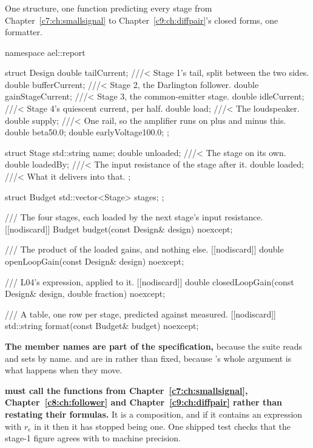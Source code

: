 \subsubsection{}
One structure, one function predicting every stage from Chapter~\ref{c7:ch:smallsignal} to Chapter~\ref{c9:ch:diffpair}'s closed forms, one formatter.

\begin{cppcode}
namespace ael::report
{
struct Design
{
    double tailCurrent{};       ///< Stage 1's tail, split between the two sides.
    double bufferCurrent{};     ///< Stage 2, the Darlington follower.
    double gainStageCurrent{};  ///< Stage 3, the common-emitter stage.
    double idleCurrent{};       ///< Stage 4's quiescent current, per half.
    double load{};              ///< The loudspeaker.
    double supply{};            ///< One rail, so the amplifier runs on plus and minus this.
    double beta{50.0};
    double earlyVoltage{100.0};
};

struct Stage
{
    std::string name{};
    double unloaded{};  ///< The stage on its own.
    double loadedBy{};  ///< The input resistance of the stage after it.
    double loaded{};    ///< What it delivers into that.
};

struct Budget
{
    std::vector<Stage> stages{};
};

/// The four stages, each loaded by the next stage's input resistance.
[[nodiscard]] Budget budget(const Design& design) noexcept;

/// The product of the loaded gains, and nothing else.
[[nodiscard]] double openLoopGain(const Design& design) noexcept;

/// L04's expression, applied to it.
[[nodiscard]] double closedLoopGain(const Design& design, double fraction) noexcept;

/// A table, one row per stage, predicted against measured.
[[nodiscard]] std::string format(const Budget& budget) noexcept;
}
\end{cppcode}

\textbf{The member names are part of the specification,} because the suite reads  and sets  by name.  and  are in  rather than fixed, because 's whole argument is what happens when they move.

\textbf{ must call the functions from Chapter~\ref{c7:ch:smallsignal}, Chapter~\ref{c8:ch:follower} and Chapter~\ref{c9:ch:diffpair} rather than restating their formulas.} It is a composition, and if it contains an expression with $r_e$ in it then it has stopped being one. One shipped test checks that the stage-1 figure agrees with  to machine precision.

